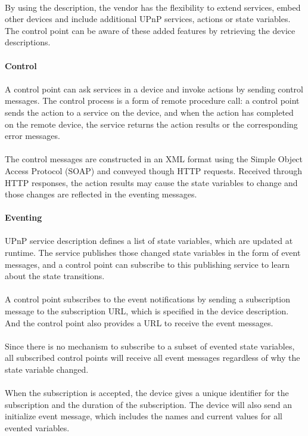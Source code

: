 \\
By using the description, the vendor has the flexibility to extend services, embed other devices and include 
additional UPnP services, actions or state variables. The control point can be
aware of these added features by retrieving the device descriptions. \\
\\
\textbf{Control} \\ 
\\
A control point can ask services in a device and invoke actions by sending
control messages. The control process is a form of remote procedure call: a
control point sends the action to a service on the device, and when the action has completed on the remote device, the service returns the action results or the corresponding error messages. \\
\\
The control messages are constructed in an XML format using the Simple Object
Access Protocol (SOAP) and conveyed though HTTP requests. Received through HTTP
responses, the action results may cause the state variables to change and those changes are reflected in the eventing messages. \\
\\
\textbf{Eventing} \\
\\ 
UPnP service description defines a list of state variables, which are updated at runtime. The service 
publishes those changed state variables in the form of event messages, and a control point can 
subscribe to this publishing service to learn about the state transitions. \\
\\
A control point subscribes to the event notifications by sending a subscription message to the 
subscription URL, which is specified in the device description. And the control
point also provides a URL to receive the event messages. \\
\\
Since there is no mechanism to subscribe to a subset of evented state variables, all subscribed 
control points will receive all event messages regardless of why the state
variable changed. \\
\\
When the subscription is accepted, the device gives a unique identifier for the subscription and 
the duration of the subscription. The device will also send an initialize event message, which 
includes the names and current values for all evented variables. \\
